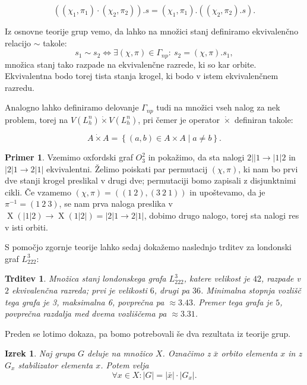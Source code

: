 \documentclass[12pt,a4paper]{amsart}
\theoremstyle{definition} %
\newtheorem{primer}[definicija]{Primer}
\theoremstyle{plain} %
\newtheorem{izrek}[definicija]{Izrek}
\newtheorem{trditev}[definicija]{Trditev}
\DeclareMathOperator {\X}{X}
\begin{document}
\[ \left((\chi_1,\pi_1) \cdot (\chi_2,\pi_2)\right).s = (\chi_1,\pi_1) . ((\chi_2,\pi_2).s) .\]

Iz osnovne teorije grup vemo, da lahko na množici stanj definiramo ekvivalenčno relacijo $\sim$ takole:
\[ s_1 \sim s_2 \iff \exists (\chi,\pi) \in \Gamma_{np}\colon \ s_2 = (\chi,\pi).s_1, \]
množica stanj tako razpade na ekvivalenčne razrede, ki so kar orbite. Ekvivalentna bodo torej tista stanja krogel, ki bodo v istem ekvivalenčnem razredu.

Analogno lahko definiramo delovanje $\Gamma_{np}$ tudi na množici vseh nalog za nek problem, torej na $V(L^n_h) \dot{\times} V(L^n_h)$, pri čemer je operator $\dot{\times}$ definiran takole:

\[ A \dot{\times} A = \left\{ (a,b) \in A \times A \mid a \neq b \right\} .\]

\begin{primer}
    \label{primer:oxf-ekv-nalogi}
    Vzemimo oxfordski graf $O^2_3$ in pokažimo, da sta nalogi $2||1 \rightarrow |1|2$ in $|2|1 \rightarrow 2|1|$ ekvivalentni. Želimo poiskati par permutacij $(\chi, \pi)$, ki nam bo prvi dve stanji krogel preslikal v drugi dve; permutaciji bomo zapisali z disjunktnimi cikli. Če vzamemo $(\chi, \pi) = ((1\ 2), (3\ 2\ 1))$ in upoštevamo, da je $\pi^{-1}=(1\ 2\ 3)$, se nam prva naloga preslika v $\X(|1|2) \rightarrow \X(1|2|) = |2|1 \rightarrow 2|1|$, dobimo drugo nalogo, torej sta nalogi res v isti orbiti.
\end{primer}
\medskip

S pomočjo zgornje teorije lahko sedaj dokažemo naslednjo trditev za londonski graf $L_{222}^3$:

\begin{trditev}
    \label{trd:simetrije-L222na3}
    Množica stanj londonskega grafa $L_{222}^3$, katere velikost je $42$, razpade v $2$ ekvivalenčna razreda; prvi je velikosti $6$, drugi pa $36$. Minimalna stopnja vozlišč tega grafa je 3, maksimalna 6, povprečna pa $\approx 3.43$. Premer tega grafa je $5$, povprečna razdalja med dvema vozliščema pa $\approx 3.31$. 
\end{trditev}

Preden se lotimo dokaza, pa bomo potrebovali še dva rezultata iz teorije grup. 

\begin{izrek}
    Naj grupa $G$ deluje na množico $X$. Označimo z $\bar{x}$ orbito elementa $x$ in z $G_x$ stabilizator elementa $x$. Potem velja
    \begin{equation}
        \forall x \in X: |G| = |\bar{x}| \cdot |G_x| .
        \label{eq:orb-stab}
    \end{equation}
\end{izrek}
\end{document}
